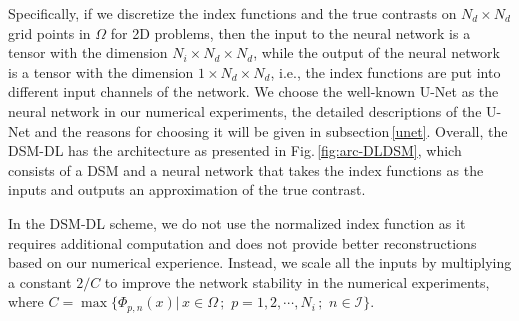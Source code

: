 \documentclass{article}
\begin{document}
    Specifically, if we discretize the index functions and the true contrasts on $N_{d}\times N_{d}$ grid points in $\Omega$ for 2D problems, then the input to the neural network is a tensor with the dimension $N_{i}\times N_{d}\times N_{d}$, while the output of the neural network is a tensor with the dimension $1\times N_{d}\times N_{d}$, i.e., the index functions are put into different input channels of the network. We choose the well-known U-Net \cite{ronneberger2015u} as the neural network in our numerical experiments, the detailed descriptions of the U-Net and the reasons for choosing it will be given in subsection\,\ref*{unet}. Overall, the DSM-DL has the architecture as presented in Fig.\,\ref{fig:arc-DLDSM}, which consists of a DSM and a neural network that takes the index functions as the inputs and outputs an approximation of the true contrast.
    
    In the DSM-DL scheme, we do not use the normalized index function as it requires additional computation and does not provide better reconstructions based on our numerical experience. Instead, we scale all the inputs by multiplying a constant $2/C$ to improve the network stability in the numerical experiments, where $C=\max\{\Phi_{p,n}(x)|\,x\in\Omega\,;\,\, p=1,2,\cdots,N_i\, ;\,\,n\in\mathcal{I}\}$.
    
\end{document}
